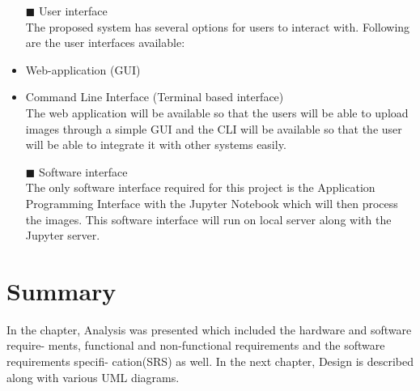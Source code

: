 \begin{itemize}
 \item[$\blacksquare$] {\large User interface}\\
The proposed system has several options for users to interact with. Following are the user interfaces available:
 \item Web-application (GUI)
 \item Command Line Interface (Terminal based interface)\\
The web application will be available so that the users will be able to upload images through a simple GUI and the CLI will be available so that the user will be able to integrate it with other systems easily.

\item[$\blacksquare$] {\large Software interface}\\
The only software interface required for this project is the Application Programming Interface with the Jupyter Notebook which will then process the images. This software interface will run on local server along with the Jupyter server.
\end{itemize}

\section{Summary}
In the chapter, Analysis was presented which included the hardware and software require- ments, functional and non-functional requirements and the software requirements specifi- cation(SRS) as well. In the next chapter, Design is described along with various UML diagrams.